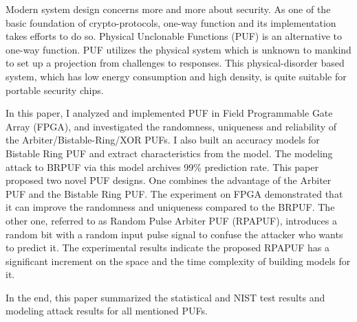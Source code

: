 \begin{eabstract}
Modern system design concerns more and more about security. As one of the basic foundation of crypto-protocols, one-way function and its implementation takes efforts to do so. Physical Unclonable Functions (PUF) is an alternative to one-way function. PUF utilizes the physical system which is unknown to mankind to set up a projection from challenges to responses. This physical-disorder based system, which has low energy consumption and high density, is quite suitable for portable security chips.

In this paper, I analyzed and implemented PUF in Field Programmable Gate Array (FPGA), and investigated the randomness, uniqueness and reliability of the Arbiter/Bistable-Ring/XOR PUFs.
I also built an accuracy models for Bistable Ring PUF and extract characteristics from the model. The modeling attack to BRPUF via this model archives 99\% prediction rate.
This paper proposed two novel PUF designs. One combines the advantage of the Arbiter PUF and the Bistable Ring PUF. The experiment on FPGA demonstrated that it can improve the randomness and uniqueness compared to the BRPUF.
The other one, referred to as Random Pulse Arbiter PUF (RPAPUF), introduces a random bit with a random input pulse signal to confuse the attacker who wants to predict it. The experimental results indicate the proposed RPAPUF has a significant increment on the space and the time complexity of building models for it.

In the end, this paper summarized the statistical and NIST test results and modeling attack results for all mentioned PUFs.

\end{eabstract}

